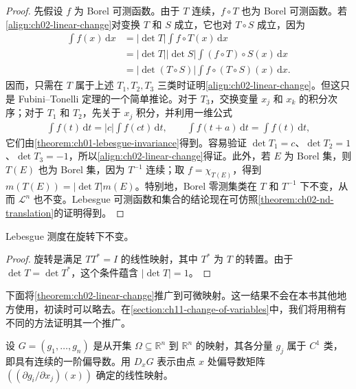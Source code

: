 \documentclass[../../main.tex]{subfiles}%
\begin{document}
\begin{proof}
先假设 $f$ 为 Borel 可测函数。由于 $T$ 连续，$f\circ T$ 也为 Borel 可测函数。若\eqref{align:ch02-linear-change}对变换 $T$ 和 $S$ 成立，它也对 $T\circ S$ 成立，因为
\begin{align*}
\int f(x)\,\mathrm{d}x
&=|\det T|\int f\circ T(x)\,\mathrm{d}x\\
&=|\det T||\det S|\int(f\circ T)\circ S(x)\,\mathrm{d}x\\
&=|\det(T\circ S)|\int f\circ(T\circ S)(x)\,\mathrm{d}x.
\end{align*}
因而，只需在 $T$ 属于上述 $T_1,T_2,T_3$ 三类时证明\eqref{align:ch02-linear-change}。但这只是 Fubini--Tonelli 定理的一个简单推论。对于 $T_3$，交换变量 $x_j$ 和 $x_k$ 的积分次序；对于 $T_1$ 和 $T_2$，先关于 $x_j$ 积分，并利用一维公式
\begin{align*}
\int f(t)\,\mathrm{d}t=|c|\int f(ct)\,\mathrm{d}t,\qquad
\int f(t+a)\,\mathrm{d}t=\int f(t)\,\mathrm{d}t,
\end{align*}
它们由\cref{theorem:ch01-lebesgue-invariance}得到。容易验证 $\det T_1=c$、$\det T_2=1$、$\det T_3=-1$，所以\eqref{align:ch02-linear-change}得证。此外，若 $E$ 为 Borel 集，则 $T(E)$ 也为 Borel 集，因为 $T^{-1}$ 连续；取 $f=\chi_{T(E)}$，得到 $m(T(E))=|\det T|m(E)$。特别地，Borel 零测集类在 $T$ 和 $T^{-1}$ 下不变，从而 $\mathscr{L}^n$ 也不变。Lebesgue 可测函数和集合的结论现在可仿照\cref{theorem:ch02-nd-translation}的证明得到。
\end{proof}
\begin{corollary}\label{corollary:ch02-rotation-invariance}
Lebesgue 测度在旋转下不变。
\end{corollary}
\begin{proof}
旋转是满足 $TT^*=I$ 的线性映射，其中 $T^*$ 为 $T$ 的转置。由于 $\det T=\det T^*$，这个条件蕴含 $|\det T|=1$。
\end{proof}
下面将\cref{theorem:ch02-linear-change}推广到可微映射。这一结果不会在本书其他地方使用，初读时可以略去。在\cref{section:ch11-change-of-variables}中，我们将用稍有不同的方法证明其一个推广。
\begin{definition}[微分映射]\label{definition:ch02-derivative-map}
设 $G=(g_1,\ldots,g_n)$ 是从开集 $\Omega\subseteq\mathbb{R}^n$ 到 $\mathbb{R}^n$ 的映射，其各分量 $g_j$ 属于 $C^1$ 类，即具有连续的一阶偏导数。用 $D_xG$ 表示由点 $x$ 处偏导数矩阵 $((\partial g_i/\partial x_j)(x))$ 确定的线性映射。
\end{definition}
\end{document}
